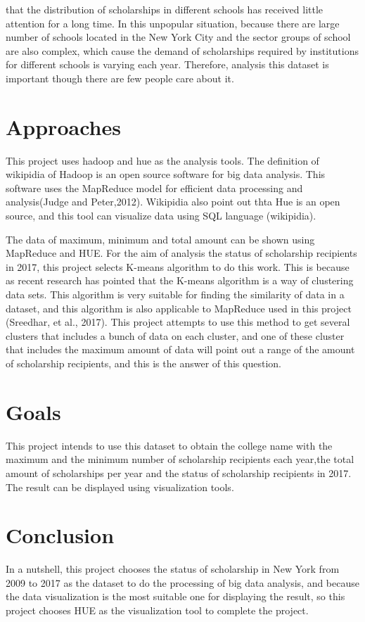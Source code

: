 \documentclass[12pt, a4paper]{article}
\begin{document}
that the distribution of scholarships in different schools has received little attention for a long time. In this unpopular situation, because there are large number of schools located in the New York City and the sector groups of school are also complex, which cause the demand of scholarships required by institutions for different schools is varying each year. Therefore, analysis this dataset is important though there are few people care about it.

\section*{Approaches} 
This project uses hadoop and hue as the analysis tools. The definition of wikipidia of Hadoop is an open source software for big data analysis. This software uses the MapReduce model for efficient data processing and analysis(Judge and Peter,2012). Wikipidia also point out thta Hue is an open source, and this tool can visualize data using SQL language (wikipidia).

The data of maximum, minimum and total amount can be shown using MapReduce and HUE. For the aim of analysis the status of scholarship recipients in 2017, this project selects K-means algorithm to do this work. This is because as recent research has pointed that the K-means algorithm is a way of clustering data sets. This algorithm is very suitable for finding the similarity of data in a dataset, and this algorithm is also applicable to MapReduce used in this project (Sreedhar, et al., 2017). This project attempts to use this method to get several clusters that includes a bunch of data on each cluster, and one of these cluster that includes the maximum amount of data will point out a range of the amount of scholarship recipients, and this is the answer of this question.


\section*{Goals}
This project intends to use this dataset to obtain the college name with the maximum and the minimum number of scholarship recipients each year,the total amount of scholarships per year and the status of scholarship recipients in 2017. The result can be displayed using visualization tools. 

\section*{Conclusion}
In a nutshell, this project chooses the status of scholarship in New York from 2009 to 2017 as the dataset to do the processing of big data analysis, and because the data visualization is the most suitable one for displaying the result, so this project chooses HUE as the visualization tool to complete the project. 
\end{document}
